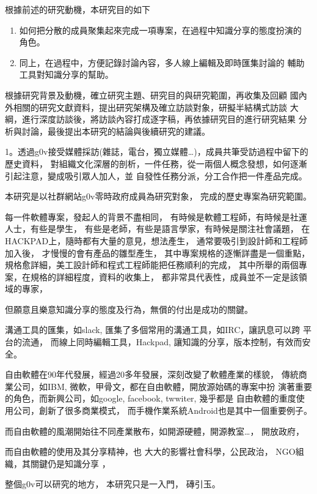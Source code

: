 根據前述的研究動機，本研究目的如下
\begin{enumerate}
\item 如何把分散的成員聚集起來完成一項專案，在過程中知識分享的態度扮演的
   角色。
\item 同上，在過程中，方便記錄討論內容，多人線上編輯及即時匯集討論的
   輔助工具對知識分享的幫助。

\end{enumerate}


根據研究背景及動機，確立研究主題、研究目的與研究範圍，再收集及回顧
國內外相關的研究文獻資料，提出研究架構及確立訪談對象，研擬半結構式訪談
大綱，進行深度訪談後，將訪談內容打成逐字稿，再依據研究目的進行研究結果
分析與討論，最後提出本研究的結論與後續研究的建議。  


1。透過g0v接受媒體採訪(雜誌，電台，獨立媒體…)，成員共筆受訪過程中留下的歷史資料，
   對組織文化深層的剖析，一件任務，從一兩個人概念發想，如何逐漸引起注意，變成吸引眾人加人，並
   自發性任務分派，分工合作把一件產品完成。 




本研究是以社群網站g0v零時政府成員為研究對象，
完成的歷史專案為研究範圍。

每一件軟體專案，發起人的背景不盡相同，
有時候是軟體工程師，有時候是社運人士，有些是學生，
有些是老師，有些是語言學家，有時候是關注社會議題，
在HACKPAD上，隨時都有大量的意見，想法產生，
通常要吸引到設計師和工程師加入後，
才慢慢的會有產品的雛型產生，
其中專案規格的逐慚詳盡是一個重點，
規格愈詳細，美工設計師和程式工程師能把任務順利的完成，
其中所舉的兩個專案，在規格的詳細程度，資料的收集上，
都非常具代表性，成員並不一定是該領域的專家，


但願意且樂意知識分享的態度及行為，無償的付出是成功的關鍵。


溝通工具的匯集，如slack, 匯集了多個常用的溝通工具，如IRC，讓訊息可以跨
平台的流通，
而線上同時編輯工具，Hackpad, 讓知識的分享，版本控制，有效而安全。




自由軟體在90年代發展，經過20多年發展，深刻改變了軟體產業的樣貌，
傳統商業公司，如IBM, 微軟，甲骨文，都在自由軟體，開放源始碼的專案中扮
演著重要的角色，而新興公司，如google, facebook, twwiter, 幾乎都是
自由軟體的重度使用公司，創新了很多商業模式，
而手機作業系統Android也是其中一個重要例子。


而自由軟體的風潮開始往不同產業散布，如開源硬體，開源教室…，
開放政府，


而自由軟體的使用及其分享精神，也
大大的影響社會科學，公民政治，
NGO組織，其關鍵仍是知識分享 ，


整個g0v可以研究的地方，
本研究只是一入門，
磚引玉。





\EndChapter
